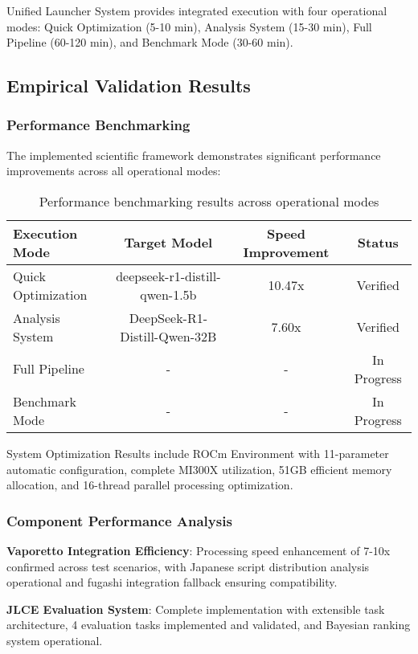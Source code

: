 \documentclass[11pt,a4paper]{article}
\begin{document}
Unified Launcher System provides integrated execution with four operational modes: Quick Optimization (5-10 min), Analysis System (15-30 min), Full Pipeline (60-120 min), and Benchmark Mode (30-60 min).

\subsection{Empirical Validation Results}

\subsubsection{Performance Benchmarking}

The implemented scientific framework demonstrates significant performance improvements across all operational modes:

\begin{table}[h]
\centering
\begin{tabular}{lccc}
\toprule
Execution Mode & Target Model & Speed Improvement & Status \\
\midrule
Quick Optimization & deepseek-r1-distill-qwen-1.5b & 10.47x & Verified \\
Analysis System & DeepSeek-R1-Distill-Qwen-32B & 7.60x & Verified \\
Full Pipeline & - & - & In Progress \\
Benchmark Mode & - & - & In Progress \\
\bottomrule
\end{tabular}
\caption{Performance benchmarking results across operational modes}
\label{tab:performance}
\end{table}

System Optimization Results include ROCm Environment with 11-parameter automatic configuration, complete MI300X utilization, 51GB efficient memory allocation, and 16-thread parallel processing optimization.

\subsubsection{Component Performance Analysis}

\textbf{Vaporetto Integration Efficiency}: Processing speed enhancement of 7-10x confirmed across test scenarios, with Japanese script distribution analysis operational and fugashi integration fallback ensuring compatibility.

\textbf{JLCE Evaluation System}: Complete implementation with extensible task architecture, 4 evaluation tasks implemented and validated, and Bayesian ranking system operational.
\end{document}
